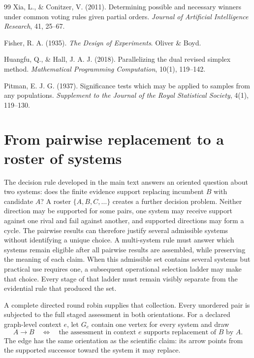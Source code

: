 \documentclass[11pt]{article}
\theoremstyle{remark}
\begin{document}
\begin{thebibliography}{99}
Xia, L., \& Conitzer, V. (2011).
Determining possible and necessary winners under common voting rules given partial orders.
\emph{Journal of Artificial Intelligence Research}, 41, 25--67.

Fisher, R. A. (1935).
\emph{The Design of Experiments}.
Oliver \& Boyd.

Huangfu, Q., \& Hall, J. A. J. (2018).
Parallelizing the dual revised simplex method.
\emph{Mathematical Programming Computation}, 10(1), 119--142.

Pitman, E. J. G. (1937).
Significance tests which may be applied to samples from any populations.
\emph{Supplement to the Journal of the Royal Statistical Society}, 4(1), 119--130.

\end{thebibliography}

\clearpage

\appendix

\section{From pairwise replacement to a roster of systems}
\label{app:multi-system}

The decision rule developed in the main text answers an oriented question
about two systems: does the finite evidence support replacing incumbent $B$
with candidate $A$? A roster $\{A,B,C,\ldots\}$ creates a further decision
problem. Neither direction may be supported for some pairs, one system may
receive support against one rival and fail against another, and supported
directions may form a cycle. The pairwise results can therefore justify
several admissible systems without identifying a unique choice. A
multi-system rule must answer which systems remain eligible after all pairwise
results are assembled, while preserving the meaning of each claim.
When this admissible set contains several systems but practical use requires
one, a subsequent operational selection ladder may make that choice. Every
stage of that ladder must remain visibly separate from the evidential rule
that produced the set.

A complete directed round robin supplies that collection. Every unordered
pair is subjected to the full staged assessment in both orientations. For a
declared graph-level context $e$, let $G_e$ contain one vertex for every system
and draw
\[
A\longrightarrow B
\quad\Longleftrightarrow\quad
\text{the assessment in context $e$ supports replacement of $B$ by $A$}.
\]
The edge has the same orientation as the scientific claim: its arrow points
from the supported successor toward the system it may replace.
\end{document}
